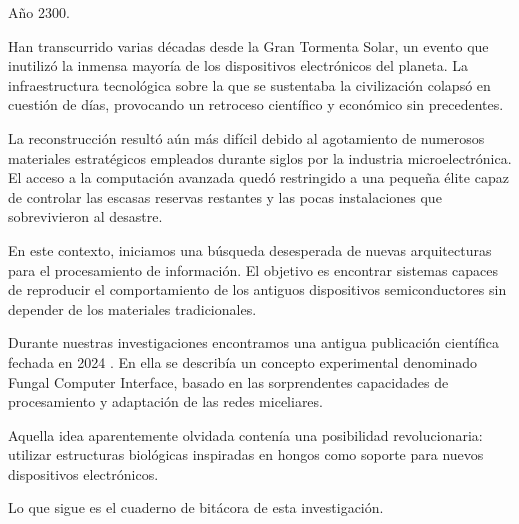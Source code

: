 \documentclass[a4paper,12pt]{article}
\begin{document}


\setlength{\parskip}{0.9em} %
\setlength{\parindent}{0pt} %

\setcounter{secnumdepth}{2} %


\newpage


Año 2300.

Han transcurrido varias décadas desde la Gran Tormenta Solar, un evento que inutilizó la inmensa mayoría de los dispositivos electrónicos del planeta. La infraestructura tecnológica sobre la que se sustentaba la civilización colapsó en cuestión de días, provocando un retroceso científico y económico sin precedentes.

La reconstrucción resultó aún más difícil debido al agotamiento de numerosos materiales estratégicos empleados durante siglos por la industria microelectrónica. El acceso a la computación avanzada quedó restringido a una pequeña élite capaz de controlar las escasas reservas restantes y las pocas instalaciones que sobrevivieron al desastre.

En este contexto, iniciamos una búsqueda desesperada de nuevas arquitecturas para el procesamiento de información. El objetivo es encontrar sistemas capaces de reproducir el comportamiento de los antiguos dispositivos semiconductores sin depender de los materiales tradicionales.

Durante nuestras investigaciones encontramos una antigua publicación científica fechada en 2024 \cite{mycosoft2024}. En ella se describía un concepto experimental denominado Fungal Computer Interface, basado en las sorprendentes capacidades de procesamiento y adaptación de las redes miceliares.

Aquella idea aparentemente olvidada contenía una posibilidad revolucionaria: utilizar estructuras biológicas inspiradas en hongos como soporte para nuevos dispositivos electrónicos.

Lo que sigue es el cuaderno de bitácora de esta investigación.


\newpage
\end{document}
